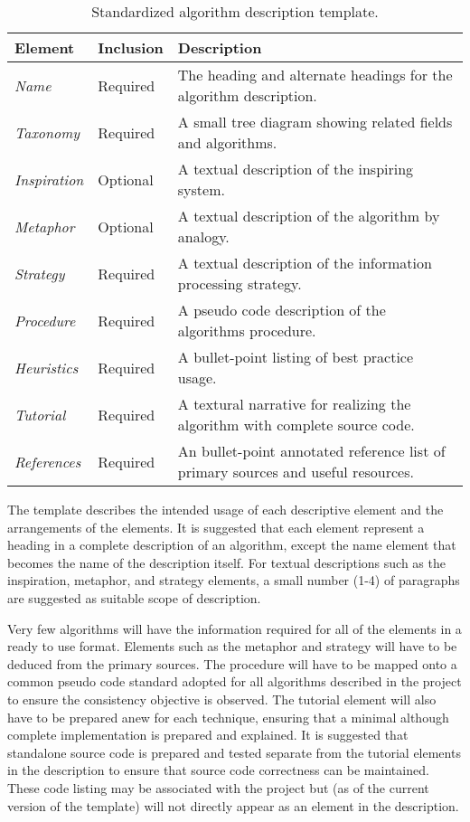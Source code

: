 \documentclass[a4paper, 11pt]{article}
\begin{document}
\begin{table}[ht]
	\centering
		\begin{tabularx}{\textwidth}{llX}
		\toprule
		\textbf{Element} & \textbf{Inclusion} &\textbf{Description} \\ 
		\toprule
		\emph{Name} & Required & The heading and alternate headings for the algorithm description.  \\ 
		\midrule
		\emph{Taxonomy} & Required & A small tree diagram showing related fields and algorithms. \\
		\midrule
		\emph{Inspiration} & Optional & A textual description of the inspiring system. \\
		\midrule
		\emph{Metaphor} & Optional & A textual description of the algorithm by analogy. \\
		\midrule
		\emph{Strategy} & Required & A textual description of the information processing strategy. \\
		\midrule
		\emph{Procedure} & Required & A pseudo code description of the algorithms procedure. \\
		\midrule
		\emph{Heuristics} & Required & A bullet-point listing of best practice usage. \\
		\midrule
		\emph{Tutorial} & Required & A textural narrative for realizing the algorithm with complete source code. \\
		\midrule
		\emph{References} & Required & An bullet-point annotated reference list of primary sources and useful resources. \\
		\bottomrule
		\end{tabularx}	
	\caption{Standardized algorithm description template.}
	\label{tab:template}
\end{table}

The template describes the intended usage of each descriptive element and the arrangements of the elements. It is suggested that each element represent a heading in a complete description of an algorithm, except the name element that becomes the name of the description itself. For textual descriptions such as the inspiration, metaphor, and strategy elements, a small number (1-4) of paragraphs are suggested as suitable scope of description.

Very few algorithms will have the information required for all of the elements in a ready to use format. Elements such as the metaphor and strategy will have to be deduced from the primary sources. The procedure will have to be mapped onto a common pseudo code standard adopted for all algorithms described in the project to ensure the consistency objective is observed. The tutorial element will also have to be prepared anew for each technique, ensuring that a minimal although complete implementation is prepared and explained. 
It is suggested that standalone source code is prepared and tested separate from the tutorial elements in the description to ensure that source code correctness can be maintained. These code listing may be associated with the project but (as of the current version of the template) will not directly appear as an element in the description.  
\end{document}
